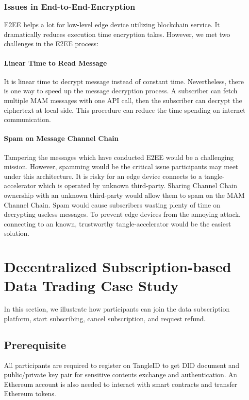 \documentclass[conference]{IEEEtran}
\begin{document}
\subsubsection{Issues in End-to-End-Encryption}
E2EE helps a lot for low-level edge device utilizing blockchain service. It dramatically reduces execution time encryption takes. However, we met two challenges in the E2EE process:

\paragraph{Linear Time to Read Message}
It is linear time to decrypt message instead of constant time. Nevertheless, there is one way to speed up the message decryption process. A subscriber can fetch multiple MAM messages with one API call, then the subscriber can decrypt the ciphertext at local side. This procedure can reduce the time spending on internet communication.

\paragraph{Spam on Message Channel Chain}
Tampering the messages which have conducted E2EE would be a challenging mission. However, spamming would be the critical issue participants may meet under this architecture. It is risky for an edge device connects to a tangle-accelerator which is operated by unknown third-party. Sharing Channel Chain ownership with an unknown third-party would allow them to spam on the MAM Channel Chain. Spam would cause subscribers wasting plenty of time on decrypting useless messages. To prevent edge devices from the annoying attack, connecting to an known, trustworthy tangle-accelerator would be the easiest solution.

\section{Decentralized Subscription-based Data Trading Case Study}
\label{section:trading_model}
In this section, we illustrate how participants can join the data subscription platform, start subscribing, cancel subscription, and request refund.

\subsection{Prerequisite}
All participants are required to register on TangleID to get DID document and public/private key pair for sensitive contents exchange and authentication. An Ethereum account is also needed to interact with smart contracts and transfer Ethereum tokens.
\end{document}
